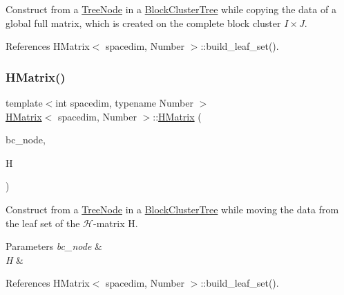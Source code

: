 Construct from a \hyperlink{classTreeNode}{Tree\+Node} in a \hyperlink{classBlockClusterTree}{Block\+Cluster\+Tree} while copying the data of a global full matrix, which is created on the complete block cluster $I \times J$. 

References H\+Matrix$<$ spacedim, Number $>$\+::build\+\_\+leaf\+\_\+set().

\mbox{\label{classHMatrix_abeb8d0add9bffecafc12f4c6b1dcab8e}} 
\subsubsection{\texorpdfstring{H\+Matrix()}{HMatrix()}\hspace{0.1cm}{\footnotesize\ttfamily [6/9]}}
{\footnotesize\ttfamily template$<$int spacedim, typename Number $>$ \\
\hyperlink{classHMatrix}{H\+Matrix}$<$ spacedim, Number $>$\+::\hyperlink{classHMatrix}{H\+Matrix} (\begin{DoxyParamCaption}\item[{typename \hyperlink{classBlockClusterTree}{Block\+Cluster\+Tree}$<$ spacedim, Number $>$\+::node\+\_\+const\+\_\+pointer\+\_\+type}]{bc\+\_\+node,  }\item[{\hyperlink{classHMatrix}{H\+Matrix}$<$ spacedim, Number $>$ \&\&}]{H }\end{DoxyParamCaption})}

Construct from a {\ttfamily \hyperlink{classTreeNode}{Tree\+Node}} in a {\ttfamily \hyperlink{classBlockClusterTree}{Block\+Cluster\+Tree}} while moving the data from the leaf set of the $\mathcal{H}$-\/matrix {\ttfamily H}.


\begin{DoxyParams}{Parameters}
{\em bc\+\_\+node} & \\
\hline
{\em H} & \\
\hline
\end{DoxyParams}


References H\+Matrix$<$ spacedim, Number $>$\+::build\+\_\+leaf\+\_\+set().

\mbox{\label{classHMatrix_a78aa967d7a99e27cc172f0db3791306b}} 
